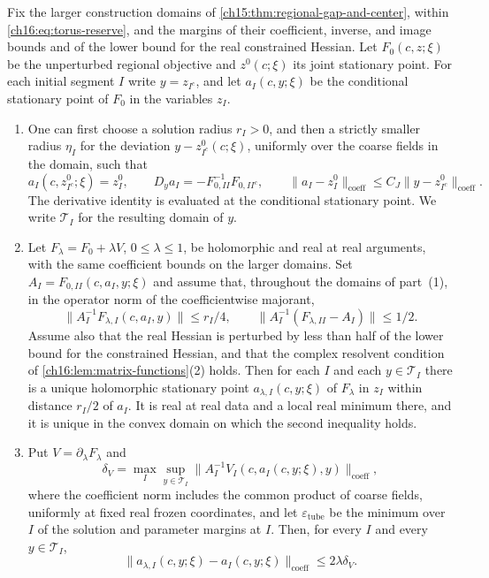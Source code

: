 \begin{lemma}\label{ch16:lem:admitted-products}
Fix the larger construction domains of \cref{ch15:thm:regional-gap-and-center}, within \eqref{ch16:eq:torus-reserve}, and the margins of their coefficient, inverse, and image bounds and of the lower bound for the real constrained Hessian. Let $F_0(c,z;\xi)$ be the unperturbed regional objective and $z^0(c;\xi)$ its joint stationary point. For each initial segment $I$ write $y=z_{I^c}$, and let $a_I(c,y;\xi)$ be the conditional stationary point of $F_0$ in the variables $z_I$.
\begin{enumerate}
\item One can first choose a solution radius $r_I>0$, and then a strictly smaller radius $\eta_I$ for the deviation $y-z^0_{I^c}(c;\xi)$, uniformly over the coarse fields in the domain, such that
\[
 a_I(c,z^0_{I^c};\xi)=z_I^0,
 \qquad D_ya_I=-F_{0,II}^{-1}F_{0,II^c},
 \qquad \|a_I-z_I^0\|_{\mathrm{coeff}}
          \le C_J\|y-z^0_{I^c}\|_{\mathrm{coeff}}.
\]
The derivative identity is evaluated at the conditional stationary point. We write $\mathcal T_I$ for the resulting domain of $y$.
\item Let $F_\lambda=F_0+\lambda V$, $0\le\lambda\le1$, be holomorphic and real at real arguments, with the same coefficient bounds on the larger domains. Set $A_I=F_{0,II}(c,a_I,y;\xi)$ and assume that, throughout the domains of part~(1), in the operator norm of the coefficientwise majorant,
\[
 \|A_I^{-1}F_{\lambda,I}(c,a_I,y)\|\le r_I/4,
 \qquad
 \|A_I^{-1}(F_{\lambda,II}-A_I)\|\le1/2.
\]
Assume also that the real Hessian is perturbed by less than half of the lower bound for the constrained Hessian, and that the complex resolvent condition of \cref{ch16:lem:matrix-functions}(2) holds. Then for each $I$ and each $y\in\mathcal T_I$ there is a unique holomorphic stationary point $a_{\lambda,I}(c,y;\xi)$ of $F_\lambda$ in $z_I$ within distance $r_I/2$ of $a_I$. It is real at real data and a local real minimum there, and it is unique in the convex domain on which the second inequality holds.
\item Put $V=\partial_\lambda F_\lambda$ and
\[
 \delta_V=\max_I\sup_{y\in\mathcal T_I}
   \|A_I^{-1}V_I(c,a_I(c,y;\xi),y)\|_{\mathrm{coeff}},
\]
where the coefficient norm includes the common product of coarse fields, uniformly at fixed real frozen coordinates, and let $\varepsilon_{\mathrm{tube}}$ be the minimum over $I$ of the solution and parameter margins at $I$. Then, for every $I$ and every $y\in\mathcal T_I$,
\[
 \|a_{\lambda,I}(c,y;\xi)-a_I(c,y;\xi)\|_{\mathrm{coeff}}\le2\lambda\delta_V.
\]
\end{enumerate}
\end{lemma}
